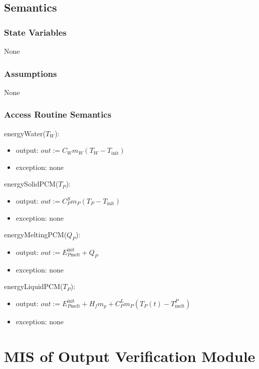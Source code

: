 \documentclass[12pt, titlepage]{article}
\begin{document}
\subsection{Semantics}

\subsubsection{State Variables}

None

\subsubsection{Assumptions}

None

\subsubsection{Access Routine Semantics}

energyWater($T_W$): 
\renewcommand*{\arraystretch}{1.5}
\begin{itemize}
\item output: $out := C_W m_W (T_W - T_\text{init})$
\item exception: none
\end{itemize}

energySolidPCM($T_P$): 
\renewcommand*{\arraystretch}{1.5}
\begin{itemize}
\item output: $out := C^S_P m_P (T_P - T_\text{init})$
\item exception: none
\end{itemize}

energyMeltingPCM($Q_P$): 
\renewcommand*{\arraystretch}{1.5}
\begin{itemize}
\item output: $out := E_{P\text{melt}}^{\text{init}} + Q_P$
\item exception: none
\end{itemize}

energyLiquidPCM($T_P$): 
\renewcommand*{\arraystretch}{1.5}
\begin{itemize}
\item output: $out := E_{P\text{melt}}^{\text{init}}+H_f m_p + C_P^L m_P(T_P(t) - T_\text{melt}^P)$
\item exception: none
\end{itemize}

\newpage
\section{MIS of Output Verification Module} \label{VerifyOutput}
\end{document}
